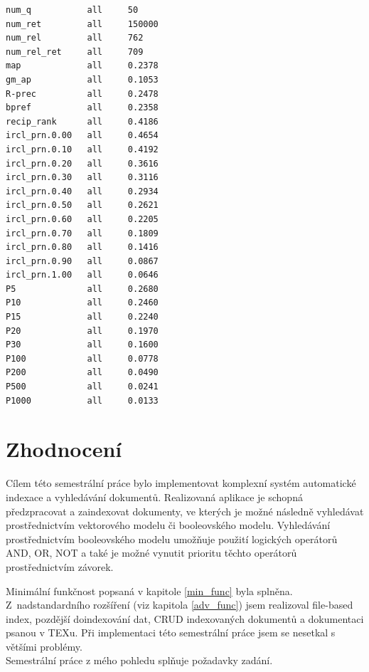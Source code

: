 \documentclass[
11pt,
a4paper,
pdftex,
czech,
titlepage
]{report}
\begin{document}
\renewcommand{\lstlistingname}{Výsledky evaluace}
\begin{lstlisting}
num_q           all     50
num_ret         all     150000
num_rel         all     762
num_rel_ret     all     709
map             all     0.2378
gm_ap           all     0.1053
R-prec          all     0.2478
bpref           all     0.2358
recip_rank      all     0.4186
ircl_prn.0.00   all     0.4654
ircl_prn.0.10   all     0.4192
ircl_prn.0.20   all     0.3616
ircl_prn.0.30   all     0.3116
ircl_prn.0.40   all     0.2934
ircl_prn.0.50   all     0.2621
ircl_prn.0.60   all     0.2205
ircl_prn.0.70   all     0.1809
ircl_prn.0.80   all     0.1416
ircl_prn.0.90   all     0.0867
ircl_prn.1.00   all     0.0646
P5              all     0.2680
P10             all     0.2460
P15             all     0.2240
P20             all     0.1970
P30             all     0.1600
P100            all     0.0778
P200            all     0.0490
P500            all     0.0241
P1000           all     0.0133
\end{lstlisting}

\section{Zhodnocení}
Cílem této semestrální práce bylo implementovat komplexní systém automatické indexace a vyhledávání dokumentů. Realizovaná aplikace je schopná předzpracovat a zaindexovat dokumenty, ve kterých je možné následně vyhledávat prostřednictvím vektorového modelu či booleovského modelu. Vyhledávání prostřednictvím booleovského modelu umožňuje použití logických operátorů AND, OR, NOT a také je možné vynutit prioritu těchto operátorů prostřednictvím závorek.

Minimální funkčnost popsaná v kapitole \ref{min_func} byla splněna. Z~nadstandardního rozšíření (viz kapitola \ref{adv_func}) jsem realizoval file-based index, pozdější doindexování dat, CRUD indexovaných dokumentů a dokumentaci psanou v TEXu. Při implementaci této semestrální práce jsem se nesetkal s většími problémy.\\

\noindent Semestrální práce z mého pohledu splňuje požadavky zadání.
\end{document}
